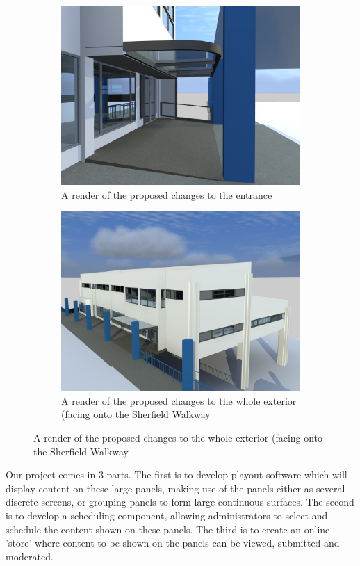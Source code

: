 \documentclass[a4paper, titlepage]{article}
\begin{document}
\begin{figure}[h!]
\centering
\begin{subfigure}{.5\textwidth}
  \centering
  \includegraphics[width=.8\linewidth]{./intro/Entrance.jpg}
  \caption{A render of the proposed changes to the entrance}
  \label{fig:sub1}
\end{subfigure}%
\begin{subfigure}{.5\textwidth}
  \centering
  \includegraphics[width=.8\linewidth]{./intro/External.jpg}
  \caption{A render of the proposed changes to the whole exterior (facing onto the Sherfield Walkway}
  \label{fig:sub2}
\end{subfigure}
\end{figure}

Our project comes in 3 parts. The first is to develop playout software which will display content on these large panels, making use of the panels either as several discrete screens, or grouping panels to form large continuous surfaces. The second is to develop a scheduling component, allowing administrators to select and schedule the content shown on these panels. The third is to create an online 'store' where content to be shown on the panels can be viewed, submitted and moderated.
\end{document}
